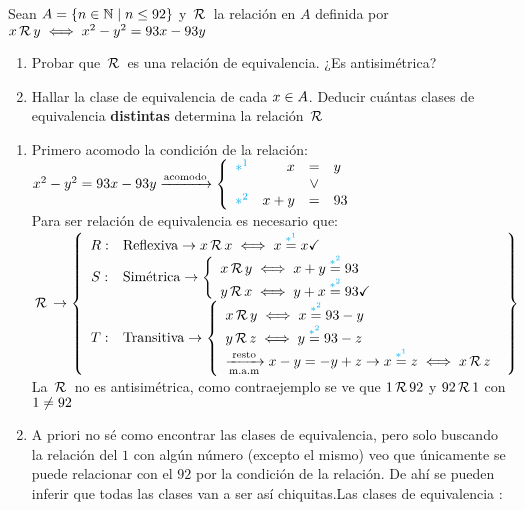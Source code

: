 \documentclass[12pt,a4paper, spanish]{article}
\begin{document}
\separadorCorto

\ejercicio
Sean $A = \left\{ n \in \mathbb N \;|\; n \leq 92 \right\}$ y
$\,\mathcal{R}\,$ la relación en $A$ definida por
$x \,\mathcal{R}\, y \iff x^2 - y^2 = 93x - 93y$
\begin{enumerate}[label=\roman*)]
	\item Probar que $\,\mathcal{R}\,$ es una relación de equivalencia. ¿Es antisimétrica?
	\item Hallar la clase de equivalencia de cada $x \in A$. Deducir cuántas clases de equivalencia \textbf{distintas} determina la relación $\,\mathcal{R}\,$
\end{enumerate}

\separadorCorto

\begin{enumerate}[label=\roman*)]
	\item Primero acomodo la condición de la relación:\\
	      $x^2 - y^2 = 93x - 93y \flecha{acomodo}
		      \llave{rrcl}{
			      \cyan{$*^1$} & x & = & y  \\
			      & & \o &\\
			      \cyan{$*^2$} & x + y & = & 93
		      }$\\
	      Para ser relación de equivalencia es necesario que:\\
	      $\relacion \to
		      \llaves{cl}{
			      R: & \text{Reflexiva} \to x \relacion x \sisolosi x \llamadaI = x  \checkmark\\
			      S: & \text{Simétrica} \to
			      \llave{l}{
				      x \relacion y \sisolosi x + y\llamadaII = 93\\
				      y \relacion x \sisolosi y + x \llamadaII = 93  \checkmark
			      }\\
			      T: & \text{Transitiva} \to
			      \llave{l}{
				      x \relacion y \sisolosi x \llamadaII = 93 - y\\
				      y \relacion z \sisolosi y \llamadaII = 93 - z \\
				      \flecha{resto}[m.a.m] x - y = -y + z \to x \llamadaI = z \sisolosi x \relacion z
			      }\\
		      }$\\
	      La $\,\mathcal{R}\,$ no es antisimétrica, como contraejemplo se ve que $1 \,\mathcal{R}\, 92$ y $92 \,\mathcal{R}\, 1$ con $1 \neq 92$

	\item
	      \begin{minipage}{0.2\textwidth}
		      \veintisiete
	      \end{minipage}
	      \begin{minipage}{0.7\textwidth}
		      A priori no sé como encontrar las clases de equivalencia, pero solo buscando la relación del $1$ con algún número (excepto el mismo) veo que únicamente
		      se puede relacionar con el $92$ por la condición de la relación. De ahí se pueden inferir que todas las clases van a ser así chiquitas.Las clases de equivalencia :


\end{minipage}
\end{enumerate}
\end{document}
